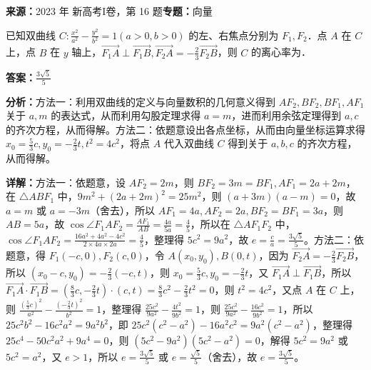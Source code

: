 \begin{question}[points=5]
\textbf{来源：}2023 年 新高考I卷，第 16 题\quad \textbf{专题：}向量\par
已知双曲线 $C:\frac{x^2}{a^2}-\frac{y^2}{b^2}=1(a>0,b>0)$ 的左、右焦点分别为 $F_1, F_2$．点 $A$ 在 $C$ 上，点 $B$ 在 $y$ 轴上，$\overrightarrow{F_1A}\perp\overrightarrow{F_1B}, \overrightarrow{F_2A}=-\frac{2}{3}\overrightarrow{F_2B}$，则 $C$ 的离心率为．
\begin{solution}
\textbf{答案：}$\frac{3\sqrt{5}}{5}$

\textbf{分析：}方法一：利用双曲线的定义与向量数积的几何意义得到 $AF_2, BF_2, BF_1, AF_1$ 关于 $a, m$ 的表达式，从而利用勾股定理求得 $a=m$，进而利用余弦定理得到 $a,c$ 的齐次方程，从而得解。方法二：依题意设出各点坐标，从而由向量坐标运算求得 $x_0=\frac{5}{3}c, y_0=-\frac{2}{3}t, t^2=4c^2$，将点 $A$ 代入双曲线 $C$ 得到关于 $a,b,c$ 的齐次方程，从而得解。

\textbf{详解：}方法一：依题意，设 $AF_2=2m$，则 $BF_2=3m=BF_1, AF_1=2a+2m$，在 $\triangle ABF_1$ 中，$9m^2+(2a+2m)^2=25m^2$，则 $(a+3m)(a-m)=0$，故 $a=m$ 或 $a=-3m$（舍去），所以 $AF_1=4a, AF_2=2a, BF_2=BF_1=3a$，则 $AB=5a$，故 $\cos\angle F_1AF_2=\frac{AF_1}{AB}=\frac{4a}{5a}=\frac{4}{5}$，所以在 $\triangle AF_1F_2$ 中，$\cos\angle F_1AF_2=\frac{16a^2+4a^2-4c^2}{2\times4a\times2a}=\frac{4}{5}$，整理得 $5c^2=9a^2$，故 $e=\frac{c}{a}=\frac{3\sqrt{5}}{5}$。方法二：依题意，得 $F_1(-c,0), F_2(c,0)$，令 $A(x_0,y_0), B(0,t)$，因为 $\overrightarrow{F_2A}=-\frac{2}{3}\overrightarrow{F_2B}$，所以 $(x_0-c, y_0)=-\frac{2}{3}(-c,t)$，则 $x_0=\frac{5}{3}c, y_0=-\frac{2}{3}t$，又 $\overrightarrow{F_1A}\perp\overrightarrow{F_1B}$，所以 $\overrightarrow{F_1A}\cdot\overrightarrow{F_1B}=(\frac{8}{3}c, -\frac{2}{3}t)\cdot(c,t)=\frac{8}{3}c^2-\frac{2}{3}t^2=0$，则 $t^2=4c^2$，又点 $A$ 在 $C$ 上，则 $\frac{(\frac{5}{3}c)^2}{a^2}-\frac{(-\frac{2}{3}t)^2}{b^2}=1$，整理得 $\frac{25c^2}{9a^2}-\frac{4t^2}{9b^2}=1$，则 $\frac{25c^2}{9a^2}-\frac{16c^2}{9b^2}=1$，所以 $25c^2b^2-16c^2a^2=9a^2b^2$，即 $25c^2(c^2-a^2)-16a^2c^2=9a^2(c^2-a^2)$，整理得 $25c^4-50c^2a^2+9a^4=0$，则 $(5c^2-9a^2)(5c^2-a^2)=0$，解得 $5c^2=9a^2$ 或 $5c^2=a^2$，又 $e>1$，所以 $e=\frac{3\sqrt{5}}{5}$ 或 $e=\frac{\sqrt{5}}{5}$（舍去），故 $e=\frac{3\sqrt{5}}{5}$。
\end{solution}
\end{question}

